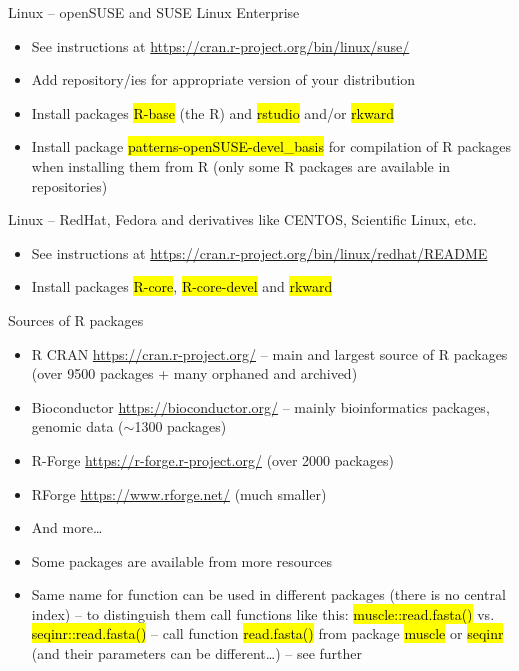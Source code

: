 \documentclass[compress, ucs, xelatex, 11pt, xcolor=svgnames,
  hyperref={
    bookmarks=true,
    unicode=true,
    colorlinks=true,
    pdftitle={Molecular data in R},
    plainpages=false,
    pdfauthor={Vojtech Zeisek},
    pdfsubject={Course about phylogeny and evolution in R},
    pdfcreator={XeLaTeX},
    pdfkeywords={R, evolution, phylogeny, molecular data},
    linkcolor=Tomato,
    anchorcolor=SaddleBrown,
    citecolor=Goldenrod,
    filecolor=DarkMagenta,
    menucolor=Sienna,
    urlcolor=DarkTurquoise,
    pdftex},
  url={hyphens, lowtilde} %
  ]{beamer}
\renewcommand{\texttt}[1]{\hl{\ttfamily #1}}
\begin{document}
\begin{frame}{Linux -- openSUSE and SUSE Linux Enterprise}
\begin{itemize}
 \item See instructions at \url{https://cran.r-project.org/bin/linux/suse/}
 \item Add repository/ies for appropriate version of your distribution
 \begin{itemize}
 \end{itemize}
 \item Install packages \texttt{R-base} (the R) and \texttt{rstudio} and/or \texttt{rkward}
 \item Install package \texttt{patterns-openSUSE-devel\_basis} for compilation of R packages when installing them from R (only some R packages are available in repositories)
\end{itemize}
\end{frame}

\begin{frame}{Linux -- RedHat, Fedora and derivatives like CENTOS, Scientific Linux, etc.}
\begin{itemize}
 \item See instructions at \url{https://cran.r-project.org/bin/linux/redhat/README}
 \item Install packages \texttt{R-core}, \texttt{R-core-devel} and \texttt{rkward}
\end{itemize}
\end{frame}

\begin{frame}{Sources of R packages}
\begin{itemize}
 \item R CRAN \url{https://cran.r-project.org/} -- main and largest source of R packages (over 9500 packages + many orphaned and archived)
 \item Bioconductor \url{https://bioconductor.org/} -- mainly bioinformatics packages, genomic data ($\sim$1300 packages)
 \item R-Forge \url{https://r-forge.r-project.org/} (over 2000 packages)
 \item RForge \url{https://www.rforge.net/} (much smaller)
 \item And more\ldots
 \item Some packages are available from more resources
 \item Same name for function can be used in different packages (there is no central index) -- to distinguish them call functions like this: \texttt{muscle::read.fasta()} vs. \texttt{seqinr::read.fasta()} -- call function \texttt{read.fasta()} from package \texttt{muscle} \alert{or} \texttt{seqinr} (and their parameters can be different\ldots) -- see further
\end{itemize}
\end{frame}
\end{document}
